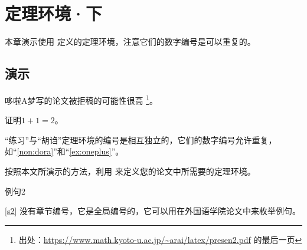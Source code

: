 \chapter{定理环境·下}

本章演示使用  定义的定理环境，注意它们的数字编号是可以重复的。

\section{演示}

\begin{nonsense}
\label{non:dora}
哆啦A梦写的论文被拒稿的可能性很高
\footnote{出处：\url{https://www.math.kyoto-u.ac.jp/~arai/latex/presen2.pdf} 的最后一页}。
\end{nonsense}

\begin{exercise}
\label{ex:oneplus}
证明$1+1 = 2$。
\end{exercise}

\begin{nonsense}[右边的胡诌是真的]
“练习”与“胡诌”定理环境的编号是相互独立的，它们的数字编号允许重复，
如“\autoref{non:dora}”和“\autoref{ex:oneplus}”。
\end{nonsense}

\begin{exercise}
按照本文所演示的方法，利用  来定义您的论文中所需要的定理环境。
\end{exercise}

\begin{lines}
\label{s2}
例句2
\end{lines}

\autoref{s2} 没有章节编号，它是全局编号的，它可以用在外国语学院论文中来枚举例句。
